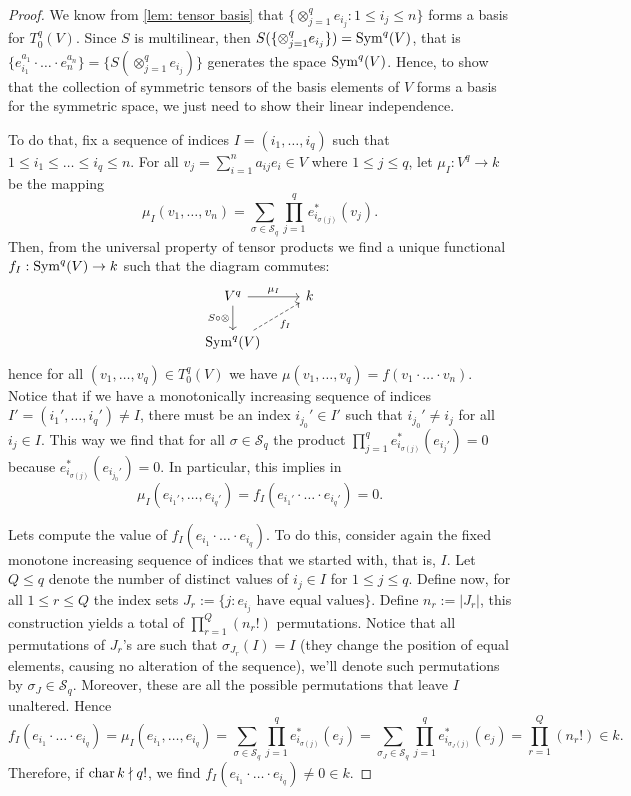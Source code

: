 \begin{proof}
  We know from \cref{lem: tensor basis} that \(\{\otimes_{j=1}^q e_{i_j}: 1 \leq
  i_j \leq n\}\) forms a basis for \(T_0^q(V)\). Since \(S\) is multilinear,
  then \(S(\{\otimes_{j=1}^q e_{i_j}\}) = \operatorname{Sym}^q(V)\), that is \(\{e_{i_1}^{a_1}
  \cdot \ldots \cdot e_n^{a_n}\} = \{S(\otimes_{j=1}^q e_{i_j})\}\) generates
  the space \(\operatorname{Sym}^q(V)\). Hence, to show that the collection of symmetric
  tensors of the basis elements of \(V\) forms a basis for the symmetric space,
  we just need to show their linear independence.

  To do that, fix a sequence of indices \(I = (i_1, \dots, i_q)\) such that  \(1
  \leq i_1 \leq \dots \leq i_q \leq n\). For all \(v_j = \sum_{i=1}^n a_{ij} e_i
  \in V\) where \(1 \leq j \leq q\), let \(\mu_I: V^q \to k\) be the mapping
  \[
    \mu_I(v_1, \dots, v_n) = \sum_{\sigma \in \mathcal S_q} \prod_{j=1}^q
    e_{i_{\sigma(j)}}^*(v_j).
  \] 
  Then, from the universal property of tensor products we find a unique
  functional \(f_I: \operatorname{Sym}^q(V) \to k\) such that the diagram commutes:
  \[
    \begin{tikzcd}
      V^q \ar[r, "\mu_I"] \ar[d, swap, "S \circ \otimes"] &k \\
      \Sym^q(V) \ar[ru, swap, dashed, "f_I"]
    \end{tikzcd}
  \] 
  hence for all \((v_1, \dots, v_q) \in T_0^q(V)\) we have \(\mu(v_1, \dots,
  v_q) = f(v_1 \cdot \ldots \cdot v_n)\). Notice that if we have a monotonically
  increasing sequence of indices \(I' = (i_1', \dots, i_q') \neq I\), there must
  be an index \(i_{j_0}' \in I'\) such that \(i_{j_0}' \neq i_j\) for all \(i_j
  \in I\). This way we find that for all \(\sigma \in \mathcal S_q\) the product
  \(\prod_{j=1}^q e_{i_{\sigma(j)}}^*(e_{i_j'}) = 0\) because
  \(e_{i_{\sigma(j)}}^*(e_{i_{j_0}'}) = 0\). In particular, this implies in
  \[
    \mu_I(e_{i_1'}, \dots, e_{i_q'}) = f_I(e_{i_1'} \cdot \ldots \cdot e_{i_q'})
    = 0.
  \] 

  Lets compute the value of \(f_I(e_{i_1} \cdot \ldots \cdot e_{i_q})\). To do
  this, consider again the fixed monotone increasing sequence of indices that we
  started with, that is, \(I\). Let \(Q \leq q\) denote the number of distinct
  values of \(i_j \in I\) for \(1 \leq j \leq q\). Define now, for all \(1 \leq
  r \leq Q\) the index sets \(J_r := \{j : e_{i_j} \text{ have equal
  values}\}\). Define \(n_r := |J_r|\), this construction yields a total of
  \(\prod_{r=1}^Q (n_r!)\) permutations. Notice that all permutations of
  \(J_r\)'s are such that \(\sigma_{J_r}(I) = I\) (they change the position of
  equal elements, causing no alteration of the sequence), we'll denote such
  permutations by \(\sigma_J \in \mathcal S_q\). Moreover, these are
  all the possible permutations that leave \(I\) unaltered. Hence
  \[
    f_I(e_{i_1} \cdot \ldots \cdot e_{i_q}) = \mu_I(e_{i_1}, \dots, e_{i_q})
    = \sum_{\sigma \in \mathcal S_q} \prod_{j=1}^q e_{i_{\sigma(j)}}^*(e_j)
    = \sum_{\sigma_J \in \mathcal S_q} \prod_{j=1}^q e_{i_{\sigma_J(j)}}^*(e_j)
    = \prod_{r=1}^Q (n_r!) \in k.
  \]
  Therefore, if \(\operatorname{char} k \nmid q!\), we find \(f_I(e_{i_1} \cdot \ldots \cdot
  e_{i_q}) \neq 0 \in k\).


\end{proof}
